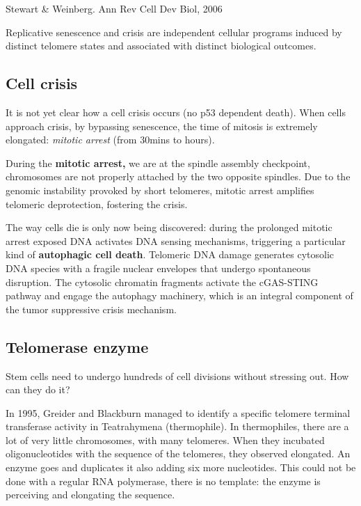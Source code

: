 Stewart \& Weinberg. Ann Rev Cell Dev Biol, 2006

Replicative senescence and crisis are independent cellular programs
induced by distinct telomere states and associated with distinct
biological outcomes.

\hypertarget{cell-crisis}{%
\subsection{Cell crisis}\label{cell-crisis}}

It is not yet clear how a cell crisis occurs (no p53 dependent death).
When cells approach crisis, by bypassing senescence, the time of mitosis
is extremely elongated: \emph{mitotic arrest} (from 30mins to hours).

During the \textbf{mitotic arrest,} we are at the spindle assembly
checkpoint, chromosomes are not properly attached by the two opposite
spindles. Due to the genomic instability provoked by short telomeres,
mitotic arrest amplifies telomeric deprotection, fostering the crisis.

The way cells die is only now being discovered: during the prolonged
mitotic arrest exposed DNA activates DNA sensing mechanisms, triggering
a particular kind of \textbf{autophagic cell death}. Telomeric DNA
damage generates cytosolic DNA species with a fragile nuclear envelopes
that undergo spontaneous disruption. The cytosolic chromatin fragments
activate the cGAS-STING pathway and engage the autophagy machinery,
which is an integral component of the tumor suppressive crisis
mechanism.

\hypertarget{telomerase-enzyme}{%
\subsection{Telomerase enzyme}\label{telomerase-enzyme}}

Stem cells need to undergo hundreds of cell divisions without stressing
out. How can they do it?

In 1995, Greider and Blackburn managed to identify a specific telomere
terminal transferase activity in Teatrahymena (thermophile). In
thermophiles, there are a lot of very little chromosomes, with many
telomeres. When they incubated oligonucleotides with the sequence of the
telomeres, they observed elongated. An enzyme goes and duplicates it
also adding six more nucleotides. This could not be done with a regular
RNA polymerase, there is no template: the enzyme is perceiving and
elongating the sequence.

